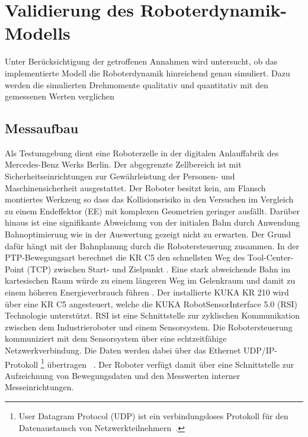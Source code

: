 \chapter{Validierung des Roboterdynamik-Modells}
\label{sec:modellvalidierung}
\label{cha:modellvalidierung}
%
Unter Berücksichtigung der getroffenen Annahmen wird untersucht, ob das implementierte Modell die Roboterdynamik hinreichend genau simuliert. Dazu werden die simulierten Drehmomente qualitativ und quantitativ mit den gemessenen Werten verglichen
%
\section{Messaufbau}
Als Testumgebung dient eine Roboterzelle in der digitalen Anlauffabrik des Mercedes-Benz Werks Berlin.
Der abgegrenzte Zellbereich ist mit Sicherheitseinrichtungen zur Gewährleistung der Personen- und Maschinensicherheit ausgestattet.
Der Roboter besitzt kein, am Flansch montiertes Werkzeug so dass das Kollisionsrisiko in den Versuchen im Vergleich zu einem Endeffektor (EE) mit komplexen Geometrien geringer ausfällt. Darüber hinaus ist eine signifikante Abweichung von der initialen Bahn durch Anwendung Bahnoptimierung wie in der Auswertung gezeigt nicht zu erwarten. Der Grund dafür hängt mit der Bahnplanung durch die Robotersteuerung zusammen. In der PTP-Bewegungsart berechnet die KR C5 den schnellsten Weg des Tool-Center-Point (TCP) zwischen Start- und Zielpunkt \cite[S.~429]{KSS.2023}. Eine stark abweichende Bahn im kartesischen Raum würde zu einem längeren Weg im Gelenkraum und damit zu einem höheren Energieverbrauch führen \cite[S.~59]{Eggers.2019}.
%
Der installierte KUKA KR 210 wird über eine KR C5 angesteuert, welche die KUKA RobotSensorInterface 5.0 (RSI) Technologie unterstützt. RSI ist eine Schnittstelle zur zyklischen Kommunikation zwischen dem Industrieroboter und einem Sensorsystem. Die Robotersteuerung kommuniziert mit dem Sensorsystem über eine echtzeitfähige Netzwerkverbindung. Die Daten werden dabei über das Ethernet UDP/IP-Protokoll \footnote{User Datagram Protocol (UDP) ist ein verbindungsloses Protokoll für den Datenaustausch von Netzwerkteilnehmern~\cite{RSI.2020}.} übertragen ~\cite[S.~11]{RSI.2020}. Der Roboter verfügt damit über eine Schnittstelle zur Aufzeichnung von Bewegungsdaten und den Messwerten interner Messeinrichtungen.  
